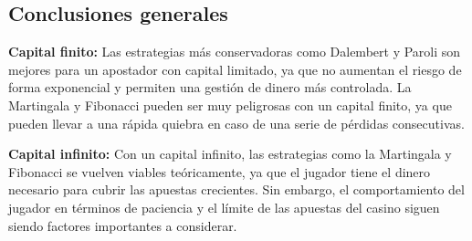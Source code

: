 \documentclass{article}
\begin{document}
\subsection{Conclusiones generales}
\textbf{Capital finito:} Las estrategias más conservadoras como Dalembert y Paroli son mejores para un apostador con capital limitado, ya que no aumentan el riesgo de forma exponencial y permiten una gestión de dinero más controlada. La Martingala y Fibonacci pueden ser muy peligrosas con un capital finito, ya que pueden llevar a una rápida quiebra en caso de una serie de pérdidas consecutivas.

\textbf{Capital infinito:} Con un capital infinito, las estrategias como la Martingala y Fibonacci se vuelven viables teóricamente, ya que el jugador tiene el dinero necesario para cubrir las apuestas crecientes. Sin embargo, el comportamiento del jugador en términos de paciencia y el límite de las apuestas del casino siguen siendo factores importantes a considerar.
\end{document}
